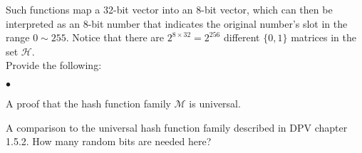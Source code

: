 \documentclass{article}
\newenvironment{myitem}{\begin{list}{$\bullet$}
{\setlength{\itemsep}{-0pt}
\setlength{\topsep}{0pt}
\setlength{\labelwidth}{0pt}
\setlength{\leftmargin}{10pt}
\setlength{\parsep}{-0pt}
\setlength{\itemsep}{0pt}
\setlength{\partopsep}{0pt}}}%
{\end{list}}
\begin{document}
\noindent Such functions map a 32-bit vector into an 8-bit vector,
which can then be interpreted as an 8-bit number that indicates the
original number's slot in the range $0 \sim 255$. Notice that there
are $2^{8\times32}=2^{256}$ different $\{0,1\}$ matrices in the set
$\mathcal{H}$.\\

\noindent Provide the following:
\begin{myitem}
\item A proof that the hash function family $\mathcal{M}$ is
  universal.

\item A comparison to the universal hash function family described in
  DPV chapter 1.5.2. How many random bits are needed here?\\
\end{myitem}

\newpage
\end{document}
